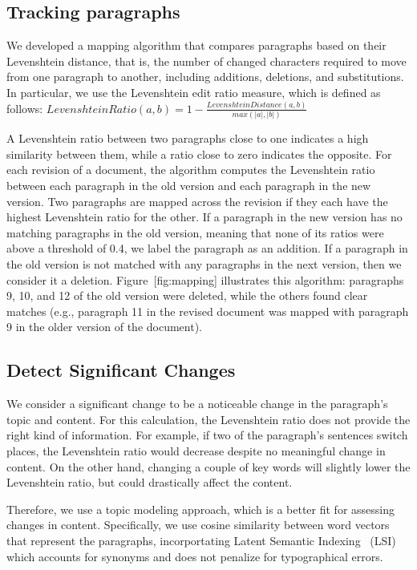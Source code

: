 \subsection{Tracking paragraphs}\label{tracking-paragraphs}

We developed a mapping algorithm that compares paragraphs based on their
Levenshtein distance, that is, the number of changed characters required
to move from one paragraph to another, including additions, deletions,
and substitutions. In particular, we use the Levenshtein edit ratio
measure, which is defined as follows:
\(Levenshtein Ratio(a,b) = 1-\frac{Levenshtein Distance(a,b)}{max(|a|,|b|)} \)

A Levenshtein ratio between two paragraphs close to one indicates a high
similarity between them, while a ratio close to zero indicates the
opposite. For each revision of a document, the algorithm computes the
Levenshtein ratio between each paragraph in the old version and each
paragraph in the new version. Two paragraphs are mapped across the
revision if they each have the highest Levenshtein ratio for the other.
If a paragraph in the new version has no matching paragraphs in the old
version, meaning that none of its ratios were above a threshold of 0.4,
we label the paragraph as an addition. If a paragraph in the old version
is not matched with any paragraphs in the next version, then we consider
it a deletion. Figure~{[}fig:mapping{]} illustrates this algorithm:
paragraphs 9, 10, and 12 of the old version were deleted, while the
others found clear matches (e.g., paragraph 11 in the revised document
was mapped with paragraph 9 in the older version of the document).

\subsection{Detect Significant
Changes}\label{detect-significant-changes}

We consider a significant change to be a noticeable change in the
paragraph's topic and content. For this calculation, the Levenshtein
ratio does not provide the right kind of information. For example, if
two of the paragraph's sentences switch places, the Levenshtein ratio
would decrease despite no meaningful change in content. On the other
hand, changing a couple of key words will slightly lower the Levenshtein
ratio, but could drastically affect the content.

Therefore, we use a topic modeling approach, which is a better fit for
assessing changes in content. Specifically, we use cosine similarity
between word vectors that represent the paragraphs, incorportating
Latent Semantic Indexing~\cite{deerwester1990indexing} (LSI) which
accounts for synonyms and does not penalize for typographical errors.

